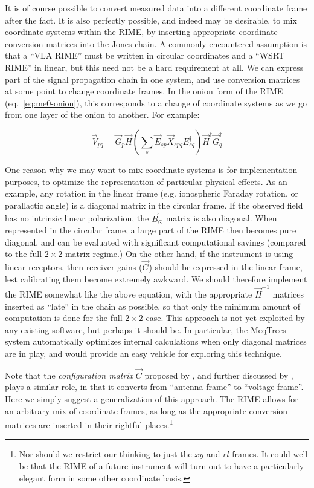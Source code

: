 \documentclass[]{aa}
\begin{document}
It is of course possible to convert measured data into a different coordinate frame after the fact. It is also perfectly possible, and indeed may be desirable, to mix coordinate systems within the RIME, by inserting appropriate coordinate conversion matrices into the Jones chain. A commonly encountered assumption is that a ``VLA RIME'' must be written in circular coordinates and a ``WSRT RIME'' in linear, but this need not be a hard requirement at all. We can express part of the signal propagation chain in one system, and use conversion matrices at some point to change coordinate frames. In the onion form of the RIME (eq.~\ref{eq:me0-onion}), this corresponds to a change of coordinate systems as we go from one layer of the onion to another. For example:

\[
\vec V_{pq} = \vec G_p \vec H \left ( \sum_{s}{\vec E_{sp} \vec X_{spq} E^\dagger_{sq}} \right ) \vec H^\dagger \vec G^\dagger_q
\] 

One reason why we may want to mix coordinate systems is for implementation purposes, to optimize the representation of particular physical effects. As an example, any rotation in the linear frame (e.g. ionospheric Faraday rotation, or parallactic angle) is a diagonal matrix in the circular frame. If the observed field has no intrinsic linear polarization, the $\vec B_\odot$ matrix is also diagonal. When represented in the circular frame, a large part of the RIME then becomes pure diagonal, and can be evaluated with significant computational savings (compared to the full $2\times2$ matrix regime.) On the other hand, if the instrument is using linear receptors, then receiver gains ($\vec G$) should be expressed in the linear frame, lest calibrating them become extremely awkward. We should therefore implement the RIME somewhat like the above equation, with the appropriate $\vec H^{-1}$ matrices inserted as ``late'' in the chain as possible, so that only the minimum amount of computation is done for the full $2\times2$ case. This approach is not yet exploited by any existing software, but perhaps it should be. In particular, the MeqTrees system \citep{meqtrees} automatically optimizes internal calculations when only diagonal matrices are in play, and would provide an easy vehicle for exploring this technique.

Note that the {\em configuration matrix} $\vec C$ proposed by \citet{ME1}, and further discussed by \citet{JEN:note185}, plays a similar role, in that it converts from ``antenna frame'' to ``voltage frame''. Here we simply suggest a generalization of this approach. The RIME allows for an arbitrary mix of coordinate frames, as long as the appropriate conversion matrices are inserted in their rightful places.\footnote{Nor should we restrict our thinking to just the $xy$ and $rl$ frames. It could well be that the RIME of a future instrument will turn out to have a particularly elegant form
in some other coordinate basis.}
\end{document}
